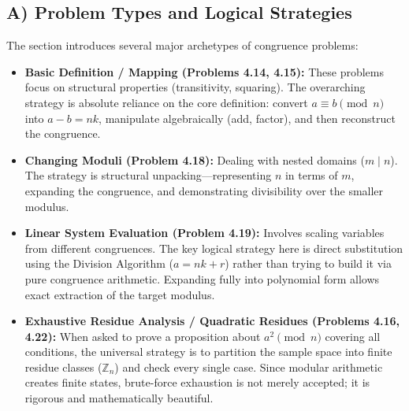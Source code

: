 \documentclass[11pt]{article}
\begin{document}
\subsection{A) Problem Types and Logical Strategies}
The section introduces several major archetypes of congruence problems:
\begin{itemize}
    \item \textbf{Basic Definition / Mapping (Problems 4.14, 4.15):} These problems focus on structural properties (transitivity, squaring). The overarching strategy is absolute reliance on the core definition: convert $a \equiv b \pmod n$ into $a - b = nk$, manipulate algebraically (add, factor), and then reconstruct the congruence.
    \item \textbf{Changing Moduli (Problem 4.18):} Dealing with nested domains ($m \mid n$). The strategy is structural unpacking—representing $n$ in terms of $m$, expanding the congruence, and demonstrating divisibility over the smaller modulus.
    \item \textbf{Linear System Evaluation (Problem 4.19):} Involves scaling variables from different congruences. The key logical strategy here is direct substitution using the Division Algorithm ($a = nk + r$) rather than trying to build it via pure congruence arithmetic. Expanding fully into polynomial form allows exact extraction of the target modulus.
    \item \textbf{Exhaustive Residue Analysis / Quadratic Residues (Problems 4.16, 4.22):} When asked to prove a proposition about $a^2 \pmod n$ covering all conditions, the universal strategy is to partition the sample space into finite residue classes ($\mathbb{Z}_n$) and check every single case. Since modular arithmetic creates finite states, brute-force exhaustion is not merely accepted; it is rigorous and mathematically beautiful.
\end{itemize}
\end{document}
